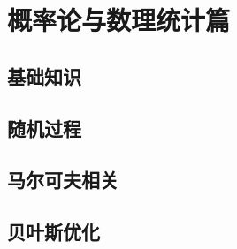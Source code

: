 \section{概率论与数理统计篇}
\subsection{基础知识}



\subsection{随机过程}


\subsection{马尔可夫相关}





\subsection{贝叶斯优化}

